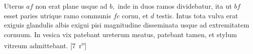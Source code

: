 Uterus $af$ non erat plane
usque ad $b,$ inde in duos ramos dividebatur, ita ut $bf$ esset paries utrique ramo communis $fc$ cornu, et $d$ testis.
Intus tota vulva erat exiguis glandulis albis exigui pisi magnitudine disseminata usque ad extremitatem cornuum.
\pend%
\pstart%
In vesica vix patebant ureterum meatus, patebant tamen, et stylum vitreum admittebant.%
[7~r\textsuperscript{o}]
